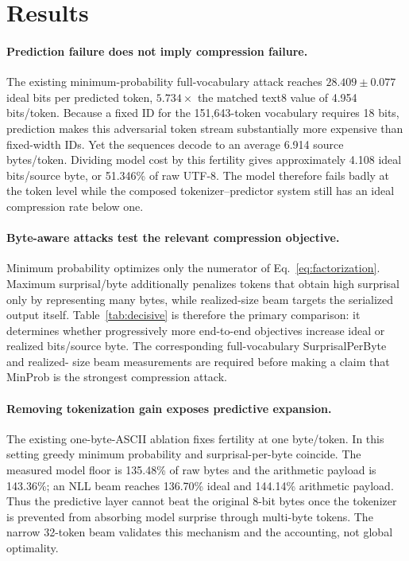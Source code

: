 \documentclass{article}
\begin{document}
\section{Results}
\label{sec:results}

\paragraph{Prediction failure does not imply compression failure.}
The existing minimum-probability full-vocabulary attack reaches
$28.409\pm0.077$ ideal bits per predicted token, $5.734\times$ the matched text8
value of 4.954 bits/token. Because a fixed ID for the 151,643-token vocabulary
requires 18 bits, prediction makes this adversarial token stream substantially more
expensive than fixed-width IDs. Yet the sequences decode to an average 6.914 source
bytes/token. Dividing model cost by this fertility gives approximately 4.108 ideal
bits/source byte, or 51.346\% of raw UTF-8. The model therefore fails badly at the
token level while the composed tokenizer--predictor system still has an ideal
compression rate below one.

\paragraph{Byte-aware attacks test the relevant compression objective.}
Minimum probability optimizes only the numerator of Eq.~\ref{eq:factorization}.
Maximum surprisal/byte additionally penalizes tokens that obtain high surprisal only
by representing many bytes, while realized-size beam targets the serialized output
itself. Table~\ref{tab:decisive} is therefore the primary comparison: it determines
whether progressively more end-to-end objectives increase ideal or realized
bits/source byte. The corresponding full-vocabulary SurprisalPerByte and realized-
size beam measurements are required before making a claim that MinProb is the
strongest compression attack.

\paragraph{Removing tokenization gain exposes predictive expansion.}
The existing one-byte-ASCII ablation fixes fertility at one byte/token. In this
setting greedy minimum probability and surprisal-per-byte coincide. The measured
model floor is 135.48\% of raw bytes and the arithmetic payload is 143.36\%; an NLL
beam reaches 136.70\% ideal and 144.14\% arithmetic payload. Thus the predictive
layer cannot beat the original 8-bit bytes once the tokenizer is prevented from
absorbing model surprise through multi-byte tokens. The narrow 32-token beam
validates this mechanism and the accounting, not global optimality.
\end{document}
